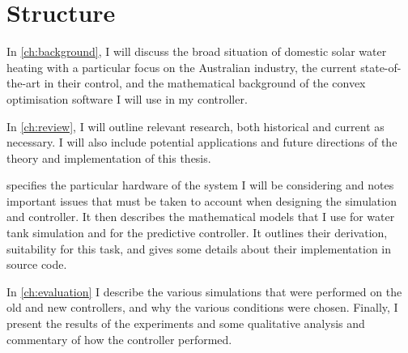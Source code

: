 \section{Structure}

In \autoref{ch:background}, I will discuss the broad situation of domestic solar water heating with a particular focus on the Australian industry, the current state-of-the-art in their control, and the mathematical background of the convex optimisation software I will use in my controller.

In \autoref{ch:review}, I will outline relevant research, both historical and current as necessary.
I will also include potential applications and future directions of the theory and implementation of this thesis.

 specifies the particular hardware of the system I will be considering and notes important issues that must be taken to account when designing the simulation and controller.
It then describes the mathematical models that I use for water tank simulation and for the predictive controller.
It outlines their derivation, suitability for this task, and gives some details about their implementation in source code.

In \autoref{ch:evaluation} I describe the various simulations that were performed on the old and new controllers, and why the various conditions were chosen.
Finally, I present the results of the experiments and some qualitative analysis and commentary of how the controller performed.
